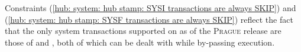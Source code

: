 \saNote{}
Constraints (\ref{hub: system: hub stamp: SYSI transactions are always SKIP})
and         (\ref{hub: system: hub stamp: SYSF transactions are always SKIP})
reflect the fact that the only system transactions supported on \linea{} as of the \textsc{Prague} release
are those of
\cite{EIP-4788} and
\cite{EIP-2935},
both of which can be dealt with while by-passing \evm{} execution.
